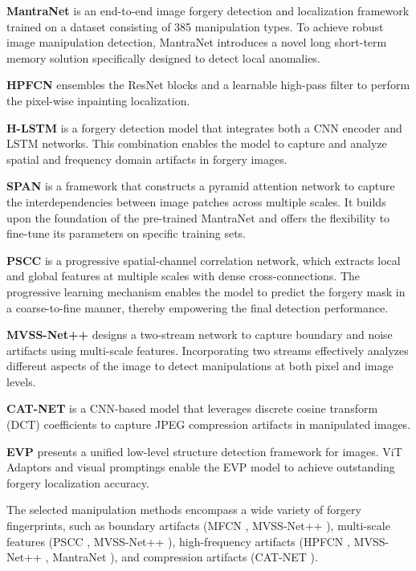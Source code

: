 \documentclass[10pt,journal,compsoc]{IEEEtran}
\begin{document}
\noindent\textbf{MantraNet} \cite{wu2019mantra} is an end-to-end image forgery detection and localization framework trained on a dataset consisting of 385 manipulation types. To achieve robust image manipulation detection, MantraNet introduces a novel long short-term memory solution specifically designed to detect local anomalies.

\noindent\textbf{HPFCN} \cite{li2019localization} ensembles the ResNet blocks and a learnable high-pass filter to perform the pixel-wise inpainting localization.  

\noindent\textbf{H-LSTM} \cite{bappy2019hybrid} is a forgery detection model that integrates both a CNN encoder and LSTM networks. This combination enables the model to capture and analyze spatial and frequency domain artifacts in forgery images.

\noindent\textbf{SPAN} \cite{hu2020span} is a framework that constructs a pyramid attention network to capture the interdependencies between image patches across multiple scales. It builds upon the foundation of the pre-trained MantraNet and offers the flexibility to fine-tune its parameters on specific training sets.

\noindent\textbf{PSCC} \cite{liu2022pscc} is a progressive spatial-channel correlation network, which extracts local and global features at multiple scales with dense cross-connections. The progressive learning mechanism enables the model to predict the forgery mask in a coarse-to-fine manner, thereby empowering the final detection performance. 

\noindent\textbf{MVSS-Net++} \cite{dong2022mvss} designs a two-stream network to capture boundary and noise artifacts using multi-scale features. Incorporating two streams effectively analyzes different aspects of the image to detect manipulations at both pixel and image levels.  

\noindent\textbf{CAT-NET} \cite{kwon2022learning} is a CNN-based model that leverages discrete cosine transform (DCT) coefficients to capture JPEG compression artifacts in manipulated images. 

\noindent\textbf{EVP} \cite{liu2023evp} presents a unified low-level structure detection framework for images. ViT Adaptors and visual promptings enable the EVP model to achieve outstanding forgery localization accuracy. 

The selected manipulation methods encompass a wide variety of forgery fingerprints, such as boundary artifacts (MFCN \cite{salloum2018image}, MVSS-Net++ \cite{dong2022mvss}), multi-scale features (PSCC \cite{liu2022pscc}, MVSS-Net++ \cite{dong2022mvss}), high-frequency artifacts (HPFCN \cite{li2019localization}, MVSS-Net++ \cite{dong2022mvss}, MantraNet \cite{wu2019mantra}), and compression artifacts (CAT-NET \cite{kwon2022learning}). 
\end{document}
